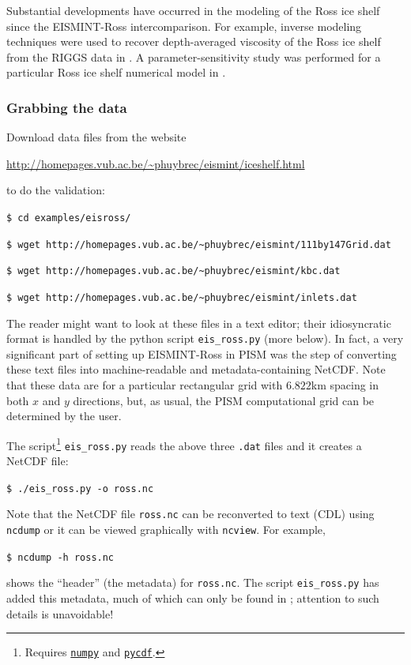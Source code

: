 \documentclass[11pt,final]{amsart}
\begin{document}
Substantial developments have occurred in the modeling of the Ross ice shelf since the EISMINT-Ross intercomparison.  For example, inverse modeling techniques were used to recover depth-averaged viscosity of the Ross ice shelf from the RIGGS data in \cite{RommelaereMacAyeal}. A parameter-sensitivity study was performed for a particular Ross ice shelf numerical model in \cite{HumbertGreveHutter}.

\subsubsection*{Grabbing the data}  Download data files from the website

\centerline{\url{http://homepages.vub.ac.be/~phuybrec/eismint/iceshelf.html}}

\noindent to do the validation:\small

\verb|$ cd examples/eisross/|

\verb|$ wget http://homepages.vub.ac.be/~phuybrec/eismint/111by147Grid.dat|

\verb|$ wget http://homepages.vub.ac.be/~phuybrec/eismint/kbc.dat|

\verb|$ wget http://homepages.vub.ac.be/~phuybrec/eismint/inlets.dat|

\normalsize\noindent The reader might want to look at these files in a text editor; their idiosyncratic format is handled by the python script \verb|eis_ross.py| (more below).  In fact, a very significant part of setting up EISMINT-Ross in PISM was the step of converting these text files into machine-readable and metadata-containing NetCDF.  Note that these data are for a particular rectangular grid with $6.822$km spacing in both $x$ and $y$ directions, but, as usual, the PISM computational grid can be determined by the user.

The script\footnote{Requires \href{http://numpy.scipy.org/}{\texttt{numpy}} and \href{http://pysclint.sourceforge.net/pycdf/}{\texttt{pycdf}}.} \verb|eis_ross.py| reads the above three \verb|.dat| files and it creates a NetCDF file:

\verb|$ ./eis_ross.py -o ross.nc|

\noindent Note that the NetCDF file \verb|ross.nc| can be reconverted to text (CDL) using \verb|ncdump| or it can be viewed graphically with \verb|ncview|.  For example,

\verb|$ ncdump -h ross.nc|

\noindent shows the ``header'' (the metadata) for \verb|ross.nc|.  The script \verb|eis_ross.py| has added this metadata, much of which can only be found in \cite{RIGGS2,RIGGS1,MacAyealetal}; attention to such details is unavoidable!
\end{document}
